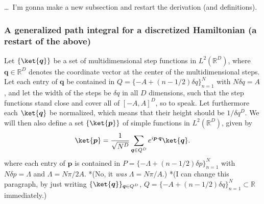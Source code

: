 \documentclass{report}
\begin{document}
\ldots\ I'm gonna make a new subsection and restart the derivation (and definitions).



\subsubsection{A generalized path integral for a discretized Hamiltonian (a restart of the above)}

Let %
$\{\ket{\boldsymbol{q}}\}$ be a set of multidimensional step functions in $L^2(\mathbb{R}^D)$, where $\boldsymbol{q}\in\mathbb{R}^D$ denotes the coordinate vector at the center of the multidimensional steps. Let each entry of $\boldsymbol{q}$ be contained in $Q=\{-A  + (n -1/2) \delta q\}_{n=1}^{N}$ with $N \delta q = A$, and let the width of the steps be $\delta q$ in all $D$ dimensions, such that the step functions stand close and cover all of $[-A, A]^D$, so to speak. Let furthermore each $\ket{\boldsymbol{q}}$ be normalized, which means that their height should be $1/\delta q^D$. We will then also define a set $\{\ket{\boldsymbol{p}}\}$ of simple functions in $L^2(\mathbb{R}^D)$, given by
\begin{align}
\begin{aligned}
	\ket{\boldsymbol{p}} = \frac{1}{\sqrt{N^{D}}} 
		\sum_{\boldsymbol{q}\in Q^D}
		e^{i \boldsymbol{p} \cdot \boldsymbol{q}} 
		\ket{\boldsymbol{q}}.
	\label{ket_p_02}
\end{aligned}
\end{align} 
where each entry of $\boldsymbol{p}$ is contained in $P=\{-\Lambda  + (n -1/2) \delta p\}_{n=1}^{N}$ with $N \delta p = \Lambda$ and $\Lambda = N \pi / 2A$. %
*(No, it \emph{was} $\Lambda = N \pi / A$.) *(I can change this paragraph, by just writing $\{\ket{\boldsymbol{q}}\}_{\boldsymbol{q}\in Q^D}$, $Q= \{-A  + (n -1/2) \delta q\}_{n=1}^{N} \subset \mathbb{R}$ immediately.)
\end{document}
